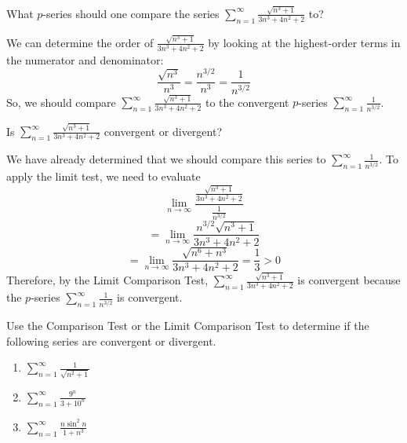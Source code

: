 \begin{Worked}
\begin{Problem}
What $p$-series should one compare the series $\sum_{n=1}^
\infty \frac{\sqrt{n^3 + 1}}{3n^3 + 4n^2 + 2}$ to?
\end{Problem}
\begin{Solution}
We can determine the order of $\frac{\sqrt{n^3 + 1}}{3n^3 
+ 4n^2 + 2}$ by looking at the highest-order terms in the numerator and 
denominator:
$$\frac{\sqrt{n^3}}{n^3} = \frac{n^{3/2}}{n^3} = \frac{1}{n^{3/2}}$$
So, we should compare $\sum_{n=1}^\infty \frac{\sqrt{n^3 + 1}}{3n^3 + 4n^2 + 2}$ 
to the convergent $p$-series $\sum_{n=1}^\infty \frac{1}{n^{3/2}}$.
\end{Solution}
\end{Worked}

\begin{Worked}
\begin{Problem}
Is $\sum_{n=1}^\infty \frac{\sqrt{n^3 + 1}}{3n^3 + 4n^2 + 2}$ 
convergent or divergent?
\end{Problem}
\begin{Solution}
We have already determined that we should compare this 
series to $\sum_{n=1}^\infty \frac{1}{n^{3/2}}$. To apply the limit test, 
we need to evaluate
$$\lim_{n \to \infty} \frac{\frac{\sqrt{n^3 + 1}}{3n^3 + 4n^2 + 2}}{\frac{1}{n^
{3/2}}}$$
$$= \lim_{n \to \infty} \frac{n^{3/2} \sqrt{n^3 + 1}}{3n^3 + 4n^2 + 2} $$
$$= \lim_{n \to \infty} \frac{\sqrt{n^6 + n^3}}{3n^3 + 4n^2 + 2} = \frac{1}{3} 
> 0$$
Therefore, by the Limit Comparison Test, $\sum_{n=1}^\infty \frac{\sqrt{n^3 + 
1}}{3n^3 + 4n^2 + 2}$ is convergent because the $p$-series $\sum_{n=1}^\infty 
\frac{1}{n^{3/2}}$ is convergent. 
\end{Solution}
\end{Worked}

\begin{Exercise}[label = comp1]
Use the Comparison Test or the Limit Comparison Test to determine if the 
following series are convergent or divergent. 
\begin{enumerate}
\item $\sum_{n=1}^\infty \frac{1}{\sqrt{n^2 + 1}}$
\item $\sum_{n=1}^\infty \frac{9^n}{3 + 10^n}$
\item $\sum_{n=1}^\infty \frac{n \sin^2{n}}{1 + n^3}$
\end{enumerate}
\vspace{50mm}
\end{Exercise}


